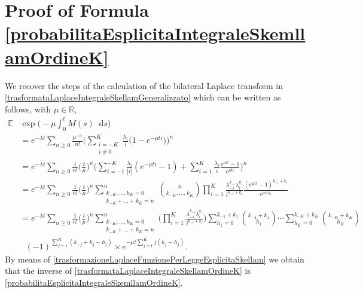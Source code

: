 \documentclass[12pt, twoside, english, headsepline]{article}
\newcommand*\dif{\mathop{}\!\mathrm{d}}  %
\theoremstyle{definition} %
\numberwithin{equation}{section} %
\begin{document}
\section{Proof of Formula \eqref{probabilitaEsplicitaIntegraleSkemllamOrdineK}}\label{appendiceLeggeIntegraleSkellamOrdineK}
We recover the steps of the calculation of the bilateral Laplace transform in \eqref{trasformataLaplaceIntegraleSkellamGeneralizzato} which can be written as follows, with $\mu\in\mathbb{R}$,
\begin{align}
	\mathbb{E}&\exp\bigg( -\mu \int_0^t M(s)\dif s\bigg) \nonumber\\
	& = e^{-\lambda t} \sum_{n\ge0} \frac{\mu^{-n}}{n!}  \Bigg( \sum_{\substack{i=-K\\ i\not=0}}^K \frac{\lambda_i}{i} \Big(1-e^{-\mu t i}\Big)\Bigg)^n\nonumber\\
	& = e^{-\lambda t} \sum_{n\ge0} \frac{1}{n!} \bigg(\frac{t}{\mu}\bigg)^n \Bigg(\sum_{i=-1}^{-K} \frac{\lambda_i}{|i|} (e^{-\mu t i}-1)  +\sum_{i=1}^K \frac{\lambda_i}{i} \frac{e^{\mu t i}-1}{e^{\mu t i}}\Bigg)^n \nonumber\\
	& =  e^{-\lambda t} \sum_{n\ge0} \frac{1}{n!} \bigg(\frac{t}{\mu}\bigg)^n \sum_{\substack{k_{-K},\dots,k_K=0\\k_{-K}+\dots+k_K = n}}^n  \binom{n}{k_{-K},\dots,k_K} \prod_{i=1}^K \frac{\lambda_{-i}^{k_{-i}} \lambda_i^{k_i}}{i^{k_{-i}+k_i}} \frac{(e^{\mu t i}-1)^{k_{-i}+k_i}}{e^{\mu t i k_i}}\nonumber\\ 
	& = e^{-\lambda t} \sum_{n\ge0} \frac{1}{n!} \bigg(\frac{t}{\mu}\bigg)^n \sum_{\substack{k_{-K},\dots,k_K=0\\k_{-K}+\dots+k_K = n}}^n \Bigg(\prod_{i=1}^K \frac{\lambda_{-i}^{k_{-i}}\lambda_{i}^{k_i}}{i^{k_{-i}+k_i}}\Bigg) \sum_{h_1 = 0}^{k_{-1}+k_1}\binom{k_{-1}+k_1}{h_1}\cdots \sum_{h_K=0}^{k_{-K} + k_K} \binom{k_{-K} + k_K}{h_K} \nonumber\\
	& \ \ \ (-1)^{\sum_{j=1}^K(k_{-j}+k_j-h_j)}\times e^{-\mu t \sum_{j=1}^K j (k_j - h_j)}. \label{trasformataLaplaceIntegraleSkellamOrdineK}
\end{align}
By means of \eqref{trasformazioneLaplaceFunzionePerLeggeEsplicitaSkellam} we obtain that the inverse of \eqref{trasformataLaplaceIntegraleSkellamOrdineK} is \eqref{probabilitaEsplicitaIntegraleSkemllamOrdineK}.
\end{document}
